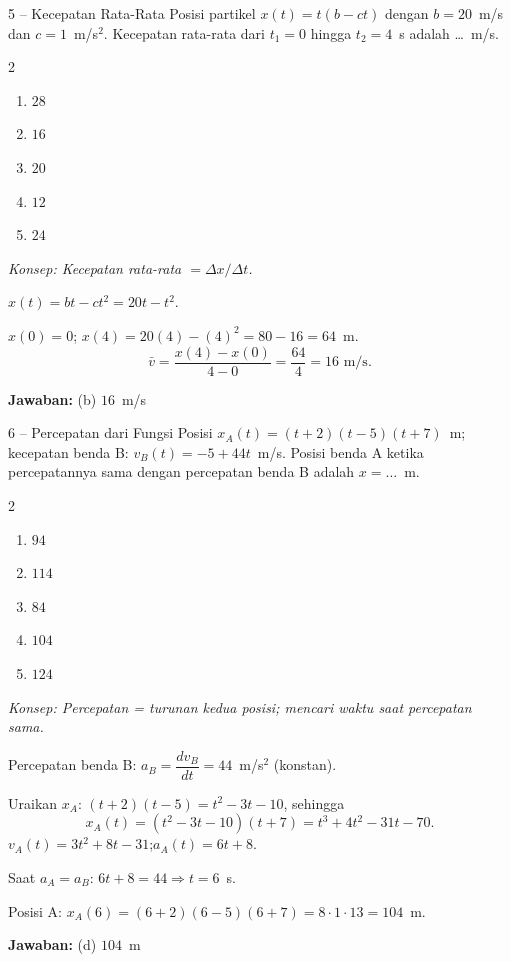 \documentclass[11pt]{article}
\newcommand{\jawaban}[1]{%
  \noindent\colorbox{gold!30}{\parbox{\dimexpr\linewidth-2\fboxsep\relax}{%
    \textbf{Jawaban:} #1}}\par\smallskip}
\newcommand{\konsep}[1]{\textit{Konsep: #1.}\par\smallskip}
\newenvironment{pilB}{%
  \par\smallskip\begin{multicols}{2}
  \begin{enumerate}[label=(\alph*),leftmargin=*,itemsep=1pt,topsep=3pt]}%
  {\end{enumerate}\end{multicols}}
\begin{document}
\begin{soal}{5 -- Kecepatan Rata-Rata}
Posisi partikel $x(t)=t(b-ct)$ dengan $b=20$~m/s dan $c=1$~m/s$^2$. Kecepatan rata-rata
dari $t_1=0$ hingga $t_2=4$~s adalah \ldots~m/s.
\begin{pilB}
  \item $28$ \item $16$ \item $20$ \item $12$ \item $24$
\end{pilB}
\end{soal}
\begin{pembox}
\konsep{Kecepatan rata-rata $=\Delta x/\Delta t$}
$x(t) = bt - ct^2 = 20t - t^2$.

$x(0)=0$; $x(4) = 20(4) - (4)^2 = 80 - 16 = 64$~m.
\[
\bar{v} = \frac{x(4)-x(0)}{4-0} = \frac{64}{4} = 16\text{ m/s}.
\]
\jawaban{(b) $16$~m/s}
\end{pembox}

\begin{soal}{6 -- Percepatan dari Fungsi Posisi}
$x_A(t)=(t+2)(t-5)(t+7)$~m; kecepatan benda B: $v_B(t)=-5+44t$~m/s. Posisi benda A
ketika percepatannya sama dengan percepatan benda B adalah $x=\ldots$~m.
\begin{pilB}
  \item $94$ \item $114$ \item $84$ \item $104$ \item $124$
\end{pilB}
\end{soal}
\begin{pembox}
\konsep{Percepatan = turunan kedua posisi; mencari waktu saat percepatan sama}
Percepatan benda B: $a_B = \dfrac{dv_B}{dt} = 44$~m/s$^2$ (konstan).

Uraikan $x_A$: $(t+2)(t-5)=t^2-3t-10$, sehingga
\[
x_A(t) = (t^2-3t-10)(t+7) = t^3+4t^2-31t-70.
\]
$v_A(t)=3t^2+8t-31$;\quad $a_A(t)=6t+8$.

Saat $a_A=a_B$: $6t+8=44 \Rightarrow t=6$~s.

Posisi A: $x_A(6) = (6+2)(6-5)(6+7) = 8\cdot1\cdot13 = 104$~m.
\jawaban{(d) $104$~m}
\end{pembox}
\end{document}
